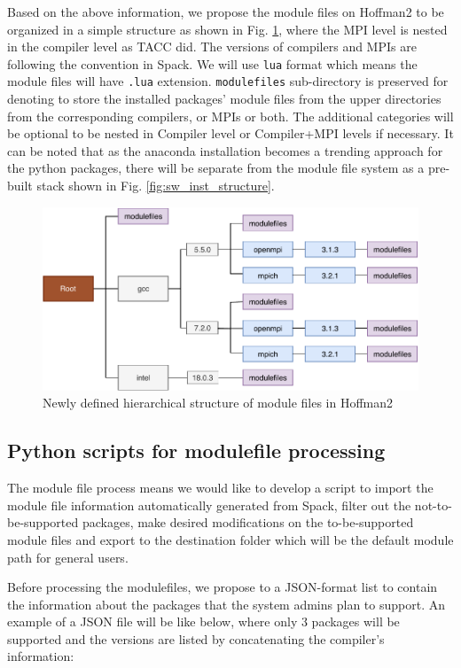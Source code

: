 \documentclass[conference]{IEEEtran}
\begin{document}
Based on the above information, we propose the module files on Hoffman2 to be organized in a simple structure as shown in Fig. \ref{fig:h2_new_hier}, where the MPI level is nested in the compiler level as TACC did. The versions of compilers and MPIs are following the convention in Spack. We will use \texttt{lua} format which means the module files will have \texttt{.lua} extension. \texttt{modulefiles} sub-directory is preserved for denoting to store the installed packages' module files from the upper directories from the corresponding compilers, or MPIs or both. The additional categories will be optional to be nested in Compiler level or Compiler+MPI levels if necessary. It can be noted that as the anaconda installation becomes a trending approach for the python packages, there will be separate from the module file system as a pre-built stack shown in Fig. \ref{fig:sw_inst_structure}.

\begin{figure}[htbp]
  \centerline{\includegraphics[width=\linewidth]{figures/h2_new_hier}}
  \caption{Newly defined hierarchical structure of module files in Hoffman2}
  \label{fig:h2_new_hier}
\end{figure}


\subsection{Python scripts for modulefile processing}\label{subsec_modulefile_processing}

The module file process means we would like to develop a script to import the module file information automatically generated from Spack, filter out the not-to-be-supported packages, make desired modifications on the to-be-supported module files and export to the destination folder which will be the default module path for general users.

Before processing the modulefiles, we propose to a JSON-format list to contain the information about the packages that the system admins plan to support. An example of a JSON file will be like below, where only 3 packages will be supported and the versions are listed by concatenating the compiler's information:
\end{document}
